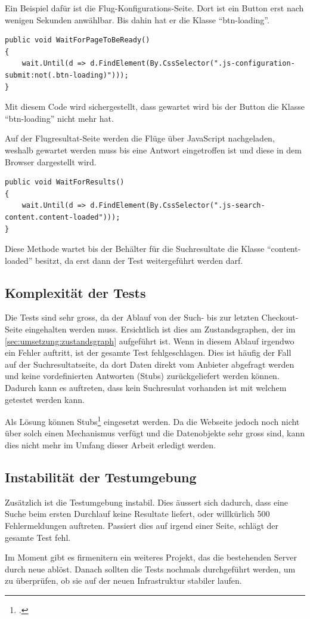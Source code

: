 Ein Beispiel dafür ist die Flug-Konfigurations-Seite. Dort ist ein Button erst nach wenigen Sekunden anwählbar. Bis dahin hat er die Klasse "`btn-loading"'.

\lstset{language=csh}
\begin{lstlisting}
public void WaitForPageToBeReady()
{
    wait.Until(d => d.FindElement(By.CssSelector(".js-configuration-submit:not(.btn-loading)")));
}
\end{lstlisting}

Mit diesem Code wird sichergestellt, dass gewartet wird bis der Button die Klasse "`btn-loading"' nicht mehr hat.

Auf der Flugresultat-Seite werden die Flüge über JavaScript nachgeladen, weshalb gewartet werden muss bis eine Antwort eingetroffen ist und diese in dem Browser dargestellt wird.

\begin{lstlisting}
public void WaitForResults()
{
    wait.Until(d => d.FindElement(By.CssSelector(".js-search-content.content-loaded")));
}
\end{lstlisting}

Diese Methode wartet bis der Behälter für die Suchresultate die Klasse "`content-loaded"' besitzt, da erst dann der Test weitergeführt werden darf.

\subsection{Komplexität der Tests}
\label{sec:umsetzung:probleme:komplexität}
Die Tests sind sehr gross, da der Ablauf von der Such- bis zur letzten Checkout-Seite eingehalten werden muss. Ersichtlich ist dies am Zustandsgraphen, der im \cref{sec:umsetzung:zustandsgraph}  aufgeführt ist. Wenn in diesem Ablauf irgendwo ein Fehler auftritt, ist der gesamte Test fehlgeschlagen. Dies ist häufig der Fall auf der Suchresultatseite, da dort Daten direkt vom Anbieter abgefragt werden und keine vordefinierten Antworten (Stubs) zurückgeliefert werden können. Dadurch kann es auftreten, dass kein Suchresulat vorhanden ist mit welchem getestet werden kann.

Als Lösung können Stubs\footcite{Stubs} eingesetzt werden. Da die Webseite jedoch noch nicht über solch einen Mechanismus verfügt und die Datenobjekte sehr gross sind, kann dies nicht mehr im Umfang dieser Arbeit erledigt werden.

\subsection{Instabilität der Testumgebung}
\label{sec:umsetzung:probleme:stabilität}
Zusätzlich ist die Testumgebung instabil. Dies äussert sich dadurch, dass eine Suche beim ersten Durchlauf keine Resultate liefert, oder willkürlich 500 Fehlermeldungen auftreten. Passiert dies auf irgend einer Seite, schlägt der gesamte Test fehl. 

Im Moment gibt es firmenitern ein weiteres Projekt, das die bestehenden Server durch neue ablöst. Danach sollten die Tests nochmals durchgeführt werden, um zu überprüfen, ob sie auf der neuen Infrastruktur stabiler laufen.
